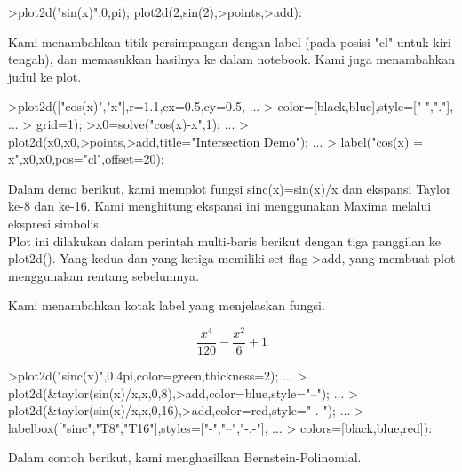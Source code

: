 \documentclass[a4paper,10pt]{article}
\begin{document}
\begin{eulernotebook}
\begin{eulercomment}
\begin{eulercomment}
\begin{eulercomment}
\begin{eulercomment}
\begin{eulercomment}
\begin{eulercomment}
\begin{eulercomment}
\begin{eulercomment}
\begin{eulerprompt}
>plot2d("sin(x)",0,pi); plot2d(2,sin(2),>points,>add):
\end{eulerprompt}
\begin{eulercomment}
Kami menambahkan titik persimpangan dengan label (pada posisi "cl"
untuk kiri tengah), dan memasukkan hasilnya ke dalam notebook. Kami
juga menambahkan judul ke plot.
\end{eulercomment}
\begin{eulerprompt}
>plot2d(["cos(x)","x"],r=1.1,cx=0.5,cy=0.5, ...
>  color=[black,blue],style=["-","."], ...
>  grid=1);
>x0=solve("cos(x)-x",1);  ...
>  plot2d(x0,x0,>points,>add,title="Intersection Demo");  ...
>  label("cos(x) = x",x0,x0,pos="cl",offset=20):
\end{eulerprompt}
\begin{eulercomment}
Dalam demo berikut, kami memplot fungsi sinc(x)=sin(x)/x dan ekspansi
Taylor ke-8 dan ke-16. Kami menghitung ekspansi ini menggunakan Maxima
melalui ekspresi simbolis.\\
Plot ini dilakukan dalam perintah multi-baris berikut dengan tiga
panggilan ke plot2d(). Yang kedua dan yang ketiga memiliki set flag
\textgreater{}add, yang membuat plot menggunakan rentang sebelumnya.

Kami menambahkan kotak label yang menjelaskan fungsi.
\end{eulercomment}
\begin{eulerformula}
\[
\frac{x^4}{120}-\frac{x^2}{6}+1
\]
\end{eulerformula}
\begin{eulerprompt}
>plot2d("sinc(x)",0,4pi,color=green,thickness=2); ...
>  plot2d(&taylor(sin(x)/x,x,0,8),>add,color=blue,style="--"); ...
>  plot2d(&taylor(sin(x)/x,x,0,16),>add,color=red,style="-.-"); ...
>  labelbox(["sinc","T8","T16"],styles=["-","--","-.-"], ...
>    colors=[black,blue,red]):
\end{eulerprompt}
\begin{eulercomment}
Dalam contoh berikut, kami menghasilkan Bernstein-Polinomial.


\end{eulercomment}
\end{eulercomment}
\end{eulercomment}
\end{eulercomment}
\end{eulercomment}
\end{eulercomment}
\end{eulercomment}
\end{eulercomment}
\end{eulercomment}
\end{eulernotebook}
\end{document}

